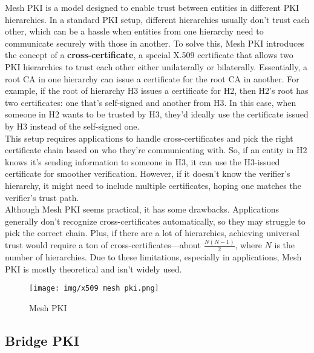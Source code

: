 Mesh PKI is a model designed to enable trust between entities in
different PKI hierarchies. In a standard PKI setup, different
hierarchies usually don't trust each other, which can be a hassle when
entities from one hierarchy need to communicate securely with those in
another. To solve this, Mesh PKI introduces the concept of a
\textbf{cross-certificate}, a special X.509 certificate that allows
two PKI hierarchies to trust each other either unilaterally or
bilaterally. Essentially, a root CA in one hierarchy can issue a
certificate for the root CA in another. For example, if the root of
hierarchy H3 issues a certificate for H2, then H2's root has two
certificates: one that's self-signed and another from H3. In this
case, when someone in H2 wants to be trusted by H3, they’d ideally use
the certificate issued by H3 instead of the self-signed one.\\
This setup requires applications to handle cross-certificates and pick
the right certificate chain based on who they’re communicating with.
So, if an entity in H2 knows it's sending information to someone in
H3, it can use the H3-issued certificate for smoother verification.
However, if it doesn’t know the verifier’s hierarchy, it might need to
include multiple certificates, hoping one matches the verifier’s trust
path.\\
Although Mesh PKI seems practical, it has some drawbacks. Applications
generally don’t recognize cross-certificates automatically, so they
may struggle to pick the correct chain. Plus, if there are a lot of
hierarchies, achieving universal trust would require a ton of
cross-certificates—about \(\frac{N(N-1)}{2}\), where \(N\) is the
number of hierarchies. Due to these limitations, especially in
applications, Mesh PKI is mostly theoretical and isn’t widely used.

\begin{figure}[H]
  \centering
  \texttt{[image: img/x509 mesh pki.png]}
  \label{fig:mesh PKI}

  \caption{Mesh PKI}
\end{figure}

\subsection{Bridge PKI}

